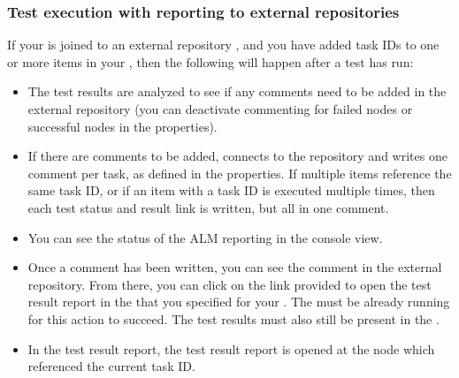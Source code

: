 
\subsubsection{Test execution with reporting to external repositories}
If your \gdproject{} is joined to an external repository , and you have added task IDs to one or more items in your \gdproject{} , then the following will happen after a test has run:

\begin{itemize}
\item The test results are analyzed to see if any comments need to be added in the external repository (you can deactivate commenting for failed nodes or successful nodes in the \gdproject{} properties). 
\item If there are comments to be added, \ite{} connects to the repository and writes one comment per task, as defined in the \gdproject{} properties. If multiple items reference the same task ID, or if an item with a task ID is executed multiple times,  then each test status and result link is written, but all in one comment. 
\item You can see the status of the ALM reporting in the console view. 
\item Once a comment has been written, you can see the comment in the external repository. From there, you can click on the link provided to open the test result report in the \dash{} that you specified for your \gdproject{}. The \dash{} must be already running for this action to succeed. The test results must also still be present in the \gddb{} .
\item In the test result report, the test result report is opened at the node which referenced the current task ID. 
\end{itemize}

